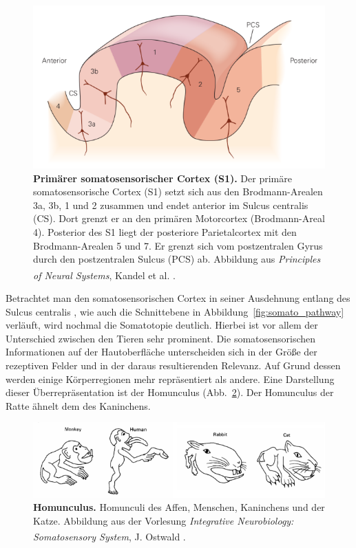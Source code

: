 \begin{figure}[H]
    \centering
    \includegraphics{pictures/somatosensory/S1_Cortex.png}
    \caption[Primärer somatosensorischer Cortex]{\textbf{Primärer somatosensorischer Cortex (S1).} Der primäre somatosensorische Cortex (S1) setzt sich aus den Brodmann-Arealen 3a, 3b, 1 und 2 zusammen und endet anterior im Sulcus centralis (CS). Dort grenzt er an den primären Motorcortex (Brodmann-Areal 4). Posterior des S1 liegt der posteriore Parietalcortex mit den Brodmann-Arealen 5 und 7. Er grenzt sich vom postzentralen Gyrus durch den postzentralen Sulcus (PCS) ab. Abbildung aus \textit{Principles of Neural Systems}, Kandel et al. \textsuperscript{\cite[Kap.~23]{kandel2013principles}}.}
    \label{fig:S1_Cortex}
\end{figure}

Betrachtet man den somatosensorischen Cortex in seiner Ausdehnung entlang des Sulcus centralis , wie auch die Schnittebene in Abbildung~\ref{fig:somato_pathway} verläuft, wird nochmal die Somatotopie  deutlich. Hierbei ist vor allem der Unterschied zwischen den Tieren sehr prominent. Die somatosensorischen Informationen auf der Hautoberfläche unterscheiden sich in der Größe der rezeptiven Felder und in der daraus resultierenden Relevanz. Auf Grund dessen werden einige Körperregionen mehr repräsentiert als andere. Eine Darstellung dieser Überrepräsentation ist der Homunculus (Abb.~\ref{fig:somato_homunculus}). Der Homunculus  der Ratte ähnelt dem des Kaninchens.


\begin{figure}[H]
    \centering
    \includegraphics[width = \textwidth] {pictures/somatosensory/homunculus.png}
    \caption[Homunculus]{\textbf{Homunculus.} Homunculi des Affen, Menschen, Kaninchens und der Katze. Abbildung aus der Vorlesung \textit{Integrative Neurobiology: Somatosensory System}, J. Ostwald \textsuperscript{\cite{Ostwald}}.}
    \label{fig:somato_homunculus}
\end{figure}

